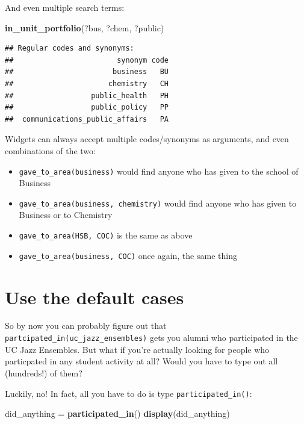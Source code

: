 \documentclass[]{book}
\newenvironment{Shaded}{\begin{snugshade}}{\end{snugshade}}
\newcommand{\KeywordTok}[1]{\textcolor[rgb]{0.13,0.29,0.53}{\textbf{#1}}}
\newcommand{\NormalTok}[1]{#1}
\newcommand{\StringTok}[1]{\textcolor[rgb]{0.31,0.60,0.02}{#1}}
\providecommand{\tightlist}{%
  \setlength{\itemsep}{0pt}\setlength{\parskip}{0pt}}
\begin{document}
And even multiple search terms:

\begin{Shaded}
\begin{Highlighting}[]
\KeywordTok{in_unit_portfolio}\NormalTok{(?bus, ?chem, ?public)}
\end{Highlighting}
\end{Shaded}

\begin{verbatim}
## Regular codes and synonyms:
##                        synonym code
##                       business   BU
##                      chemistry   CH
##                  public_health   PH
##                  public_policy   PP
##  communications_public_affairs   PA
\end{verbatim}

Widgets can always accept multiple codes/synonyms as arguments, and even combinations of the two:

\begin{itemize}
\tightlist
\item
  \texttt{gave\_to\_area(business)} would find anyone who has given to the school of Business
\item
  \texttt{gave\_to\_area(business,\ chemistry)} would find anyone who has given to Business or to Chemistry
\item
  \texttt{gave\_to\_area(HSB,\ COC)} is the same as above
\item
  \texttt{gave\_to\_area(business,\ COC)} once again, the same thing
\end{itemize}

\hypertarget{use-defaults}{%
\section{Use the default cases}\label{use-defaults}}

So by now you can probably figure out that \texttt{partcipated\_in(uc\_jazz\_ensembles)} gets you alumni who participated in the UC Jazz Ensembles. But what if you're actually looking for people who particpated in any student activity at all? Would you have to type out all (hundreds!) of them?

Luckily, no! In fact, all you have to do is type \texttt{participated\_in()}:

\begin{Shaded}
\begin{Highlighting}[]
\NormalTok{did_anything =}\StringTok{ }\KeywordTok{participated_in}\NormalTok{()}
\KeywordTok{display}\NormalTok{(did_anything)}
\end{Highlighting}
\end{Shaded}
\end{document}

